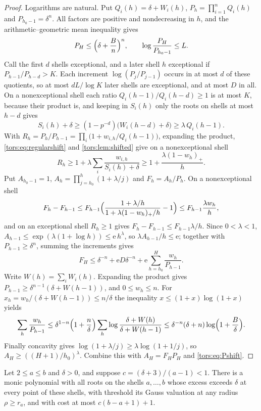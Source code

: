 \begin{proof}
Logarithms are natural. Put $Q_i(h)=\delta+W_i(h)$, $P_h=\prod_{i=1}^nQ_i(h)$ and
$P_{h_0-1}=\delta^n$. All factors are positive and nondecreasing in $h$, and the
arithmetic--geometric mean inequality gives
\begin{equation}\label{tors:eq:Pshift}
 P_H\le\Bigl(\delta+\frac Bn\Bigr)^n,\qquad \log\frac{P_H}{P_{h_0-1}}\le L .
\end{equation}
Call the first $d$ shells exceptional, and a later shell $h$ exceptional if
$P_{h-1}/P_{h-d}>K$. Each increment $\log(P_j/P_{j-1})$ occurs in at most $d$ of these
quotients, so at most $dL/\log K$ later shells are exceptional, and at most $D$ in all. On
a nonexceptional shell each ratio $Q_i(h-1)/Q_i(h-d)\ge1$ is at most $K$, because their
product is, and keeping in $S_i(h)$ only the roots on shells at most $h-d$ gives
\begin{equation}\label{tors:eq:regularshift}
 S_i(h)+\delta\ge(1-p^{-d})\bigl(W_i(h-d)+\delta\bigr)\ge\lambda\,Q_i(h-1).
\end{equation}
With $R_h=P_h/P_{h-1}=\prod_i\bigl(1+w_{i,h}/Q_i(h-1)\bigr)$, expanding the product,
\eqref{tors:eq:regularshift} and \cref{tors:lem:shifted} give on a nonexceptional shell
\[
 R_h\ge1+\lambda\sum_i\frac{w_{i,h}}{S_i(h)+\delta}\ge1+\frac{\lambda(1-w_h)_+}h .
\]
Put $A_{h_0-1}=1$, $A_h=\prod_{j=h_0}^h(1+\lambda/j)$ and $F_h=A_h/P_h$. On a
nonexceptional shell
\[
 F_h-F_{h-1}\le F_{h-1}\Bigl(\frac{1+\lambda/h}{1+\lambda(1-w_h)_+/h}-1\Bigr)
 \le F_{h-1}\frac{\lambda w_h}h ,
\]
and on an exceptional shell $R_h\ge1$ gives $F_h-F_{h-1}\le F_{h-1}\lambda/h$. Since
$0<\lambda<1$, $A_{h-1}\le\exp(\lambda(1+\log h))\le\mathrm e\,h^\lambda$, so
$\lambda A_{h-1}/h\le\mathrm e$; together with $P_{h-1}\ge\delta^n$, summing the increments
gives
\[
 F_H\le\delta^{-n}+\mathrm eD\delta^{-n}+\mathrm e\sum_{h=h_0}^H\frac{w_h}{P_{h-1}} .
\]
Write $W(h)=\sum_iW_i(h)$. Expanding the product gives
$P_{h-1}\ge\delta^{n-1}(\delta+W(h-1))$, and $0\le w_h\le n$. For
$x_h=w_h/(\delta+W(h-1))\le n/\delta$ the inequality $x\le(1+x)\log(1+x)$ yields
\[
 \sum_h\frac{w_h}{P_{h-1}}\le\delta^{1-n}\Bigl(1+\frac n\delta\Bigr)
 \sum_h\log\frac{\delta+W(h)}{\delta+W(h-1)}\le\delta^{-n}(\delta+n)\log\Bigl(1+\frac B\delta\Bigr).
\]
Finally concavity gives $\log(1+\lambda/j)\ge\lambda\log(1+1/j)$, so
$A_H\ge((H+1)/h_0)^\lambda$. Combine this with $A_H=F_HP_H$ and \eqref{tors:eq:Pshift}.
\end{proof}

\begin{lemma}\label{tors:lem:lateblock}
Let $2\le a\le b$ and $\delta>0$, and suppose $c=(\delta+3)/(a-1)<1$. There is a monic
polynomial with all roots on the shells $a,\dots,b$ whose excess exceeds $\delta$ at every
point of these shells, with threshold its Gauss valuation at any radius $\rho\ge r_a$, and
with cost at most $c(b-a+1)+1$.
\end{lemma}

